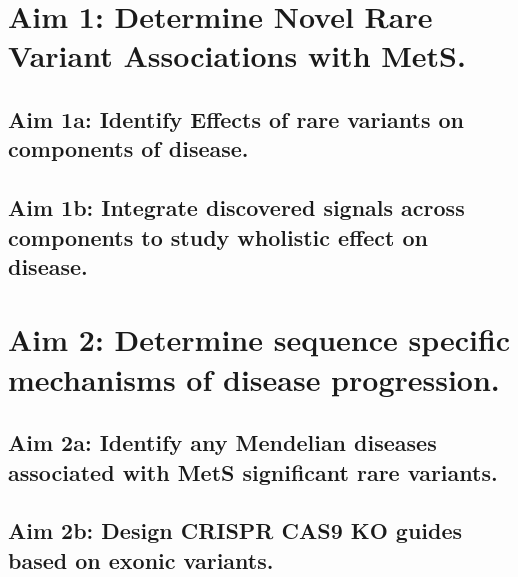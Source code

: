 \documentclass[11pt]{article}
\begin{document}
\section*{Aim 1: Determine Novel Rare Variant Associations with MetS.}

\subsection*{Aim 1a: Identify Effects of rare variants on components of disease.}

\subsection*{Aim 1b: Integrate discovered signals across components to study wholistic effect on disease.}

\section*{Aim 2: Determine sequence specific mechanisms of disease progression.}

\subsection*{Aim 2a: Identify any Mendelian diseases associated with MetS significant rare variants.}

\subsection*{Aim 2b: Design CRISPR CAS9 KO guides based on exonic variants.}

\newpage

 

\end{document}
